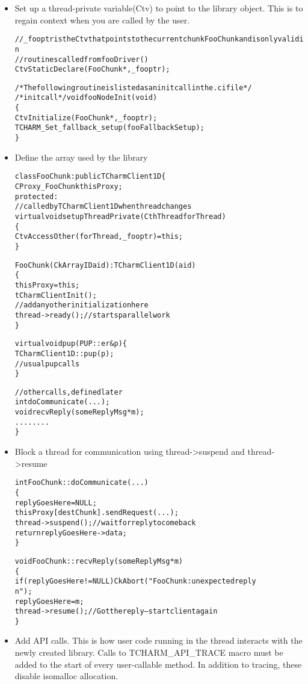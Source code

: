 \documentclass[10pt]{article}
\begin{document}
\begin{itemize}
\item Set up a thread-private variable(Ctv) to point to the library object. 
This is to regain context when you are called by the user.

\begin{alltt}
//\_fooptr is the Ctv that points to the current chunk FooChunk and is only valid in 
//routines called from fooDriver()
CtvStaticDeclare(FooChunk *, \_fooptr);

/* The following routine is listed as an initcall in the .ci file */
/*initcall*/ void fooNodeInit(void)
\{
  CtvInitialize(FooChunk*, \_fooptr);
  TCHARM\_Set\_fallback\_setup(fooFallbackSetup);
\}
\end{alltt}

\item Define the array used by the library

\begin{alltt}
class FooChunk: public TCharmClient1D \{
   CProxy\_FooChunk thisProxy;
protected:
   //called by TCharmClient1D when thread changes
   virtual void setupThreadPrivate(CthThread forThread)
   \{
      CtvAccessOther(forThread, \_fooptr) = this;
   \}
   
   FooChunk(CkArrayID aid):TCharmClient1D(aid)
   \{
      thisProxy = this;
      tCharmClientInit();
      //add any other initialization here
      thread->ready(); //starts parallel work  
   \}

   virtual void pup(PUP::er &p) \{
     TCharmClient1D::pup(p);
     //usual pup calls
   \}
   
   //other calls, defined later
   int doCommunicate(...);
   void recvReply(someReplyMsg *m);
   ........
\}
\end{alltt}


\item Block a thread for communication using thread->suspend and
thread->resume

\begin{alltt}
int FooChunk::doCommunicate(...)
\{
   replyGoesHere = NULL;
   thisProxy[destChunk].sendRequest(...);
   thread->suspend(); //wait for reply to come back
   return replyGoesHere->data;
\}

void FooChunk::recvReply(someReplyMsg *m)
\{
  if(replyGoesHere!=NULL) CkAbort("FooChunk: unexpected reply\\n");
  replyGoesHere = m;
  thread->resume(); //Got the reply -- start client again
\}
\end{alltt}


\item Add API calls. This is how user code running in the thread interacts
with the newly created library. Calls to TCHARM\_API\_TRACE macro must be 
added to the start of every user-callable method. In addition to tracing,
these disable isomalloc allocation. 


\end{itemize}
\end{document}
